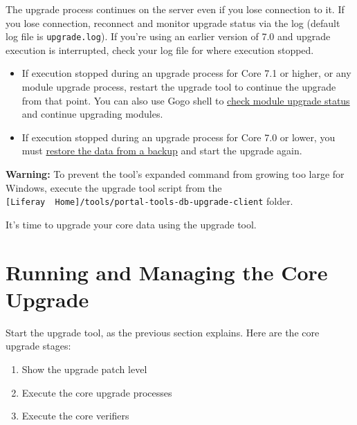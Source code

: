 The upgrade process continues on the server even if you lose connection
to it. If you lose connection, reconnect and monitor upgrade status via
the log (default log file is \texttt{upgrade.log}). If you're using an
earlier version of 7.0 and upgrade execution is interrupted, check your
log file for where execution stopped.

\begin{itemize}
\tightlist
\item
  If execution stopped during an upgrade process for Core 7.1 or higher,
  or any module upgrade process, restart the upgrade tool to continue
  the upgrade from that point. You can also use Gogo shell to
  \href{/docs/7-2/deploy/-/knowledge_base/d/upgrading-modules-using-gogo-shell\#checking-upgrade-status}{check
  module upgrade status} and continue upgrading modules.
\item
  If execution stopped during an upgrade process for Core 7.0 or lower,
  you must
  \href{/docs/7-2/deploy/-/knowledge_base/d/backing-up-a-liferay-installation}{restore
  the data from a backup} and start the upgrade again.
\end{itemize}

\noindent\hrulefill

\noindent\hrulefill

\textbf{Warning:} To prevent the tool's expanded command from growing
too large for Windows, execute the upgrade tool script from the
\texttt{{[}Liferay\ \ Home{]}/tools/portal-tools-db-upgrade-client}
folder.

\noindent\hrulefill

It's time to upgrade your core data using the upgrade tool.

\section{Running and Managing the Core
Upgrade}\label{running-and-managing-the-core-upgrade}

Start the upgrade tool, as the previous section explains. Here are the
core upgrade stages:

\begin{enumerate}
\def\labelenumi{\arabic{enumi}.}
\item
  Show the upgrade patch level
\item
  Execute the core upgrade processes
\item
  Execute the core verifiers
\end{enumerate}

